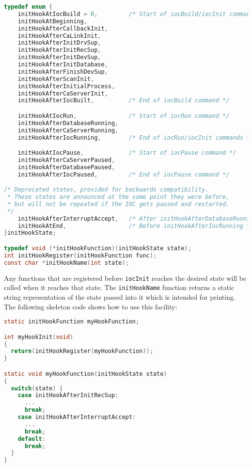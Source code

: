 \begin{lstlisting}[language=C]
typedef enum {
    initHookAtIocBuild = 0,         /* Start of iocBuild/iocInit commands */
    initHookAtBeginning,
    initHookAfterCallbackInit,
    initHookAfterCaLinkInit,
    initHookAfterInitDrvSup,
    initHookAfterInitRecSup,
    initHookAfterInitDevSup,
    initHookAfterInitDatabase,
    initHookAfterFinishDevSup,
    initHookAfterScanInit,
    initHookAfterInitialProcess,
    initHookAfterCaServerInit,
    initHookAfterIocBuilt,          /* End of iocBuild command */

    initHookAtIocRun,               /* Start of iocRun command */
    initHookAfterDatabaseRunning,
    initHookAfterCaServerRunning,
    initHookAfterIocRunning,        /* End of iocRun/iocInit commands */

    initHookAtIocPause,             /* Start of iocPause command */
    initHookAfterCaServerPaused,
    initHookAfterDatabasePaused,
    initHookAfterIocPaused,         /* End of iocPause command */

/* Deprecated states, provided for backwards compatibility.
 * These states are announced at the same point they were before,
 * but will not be repeated if the IOC gets paused and restarted.
 */
    initHookAfterInterruptAccept,   /* After initHookAfterDatabaseRunning */
    initHookAtEnd,                  /* Before initHookAfterIocRunning */
}initHookState;

typedef void (*initHookFunction)(initHookState state);
int initHookRegister(initHookFunction func);
const char *initHookName(int state);
\end{lstlisting}

Any functions that are registered before \verb|iocInit| reaches the desired state will be called when it reaches that state.
The \verb|initHookName| function returns a static string representation of the state passed into it which is intended for printing.
The following skeleton code shows how to use this facility:

\begin{lstlisting}[language=C]
static initHookFunction myHookFunction;

int myHookInit(void)
{
  return(initHookRegister(myHookFunction));
}

static void myHookFunction(initHookState state)
{
  switch(state) {
    case initHookAfterInitRecSup:
      ...
      break;
    case initHookAfterInterruptAccept:
      ...
      break;
    default:
      break;
  }
}
\end{lstlisting}

